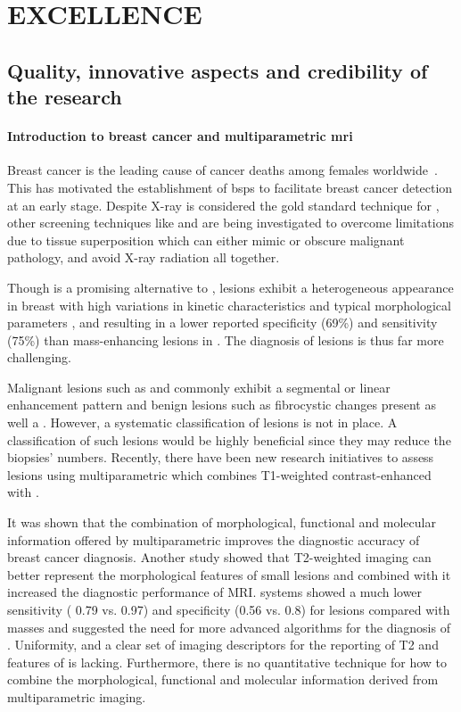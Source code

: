\section{EXCELLENCE}
\label{sec:excellence}

\subsection{Quality, innovative aspects and credibility of the research}
\label{sec:quality}
\paragraph{Introduction to breast cancer and multiparametric \acs{mri}}

Breast cancer is the leading cause of cancer deaths among females
worldwide~\cite{cancerStatistics2011}. This has motivated the establishment of
\acp{bsp} to facilitate breast cancer detection at an early stage. Despite
X-ray \dm is considered the gold standard technique for \bsp, other screening
techniques like \us and \mri are being investigated to overcome \dm limitations
due to tissue superposition which can either mimic or obscure malignant
pathology, and avoid X-ray radiation all together.

Though \mri is a promising alternative to \dm, \nmle lesions exhibit
a heterogeneous appearance in breast \mri with high variations in kinetic
characteristics and typical morphological parameters , and resulting in a lower reported specificity (69\%) and sensitivity
(75\%) than mass-enhancing lesions in \cemri.  The diagnosis of
\nmle lesions is thus far more challenging.

Malignant lesions such as \dci and \ilc commonly exhibit a segmental or linear
enhancement pattern and benign lesions such as fibrocystic changes present as
well a \nmle {}.  However, a systematic classification of \nmle
lesions is not in place. A classification of such lesions would be highly
beneficial since they may reduce the biopsies’ numbers.  Recently, there have
been new research initiatives to assess \nmle lesions using multiparametric
\mri which combines T1-weighted contrast-enhanced \mri with \dwi {}.

It was shown that the combination of morphological, functional and molecular
information offered by multiparametric \mri improves the diagnostic accuracy of
breast cancer diagnosis.  Another study showed that T2-weighted imaging can
better represent the morphological features of small lesions 
and combined with \dwi it increased the diagnostic performance of MRI.  \cad
systems showed a much lower sensitivity ( 0.79 vs.
0.97) and specificity (0.56 vs. 0.8) for \nmle lesions compared with masses and
suggested the need for more advanced algorithms for the diagnosis of \nmle
{}.  Uniformity, and a clear set of
imaging descriptors for the reporting of T2 and \dwi features of \nmle is
lacking. Furthermore, there is no quantitative technique for how to combine the
morphological, functional and molecular information derived from
multiparametric imaging.



